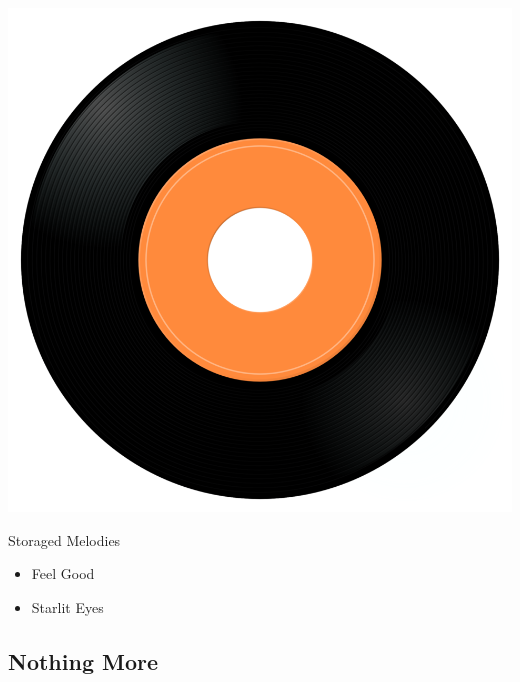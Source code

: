 \begin{minipage}[t]{0.25\textwidth}
\captionsetup{type=figure}
\includegraphics[width=\textwidth]{Images/cover.png}
\caption*{Storaged Melodies}
\end{minipage}
\begin{minipage}[t]{0.25\textwidth}\vspace{0pt}
\begin{itemize}[nosep,leftmargin=1em,labelwidth=*,align=left]
	\setlength{\itemsep}{0pt}
	\item Feel Good
	\item Starlit Eyes
\end{itemize}
\end{minipage}

\subsection{Nothing More}

